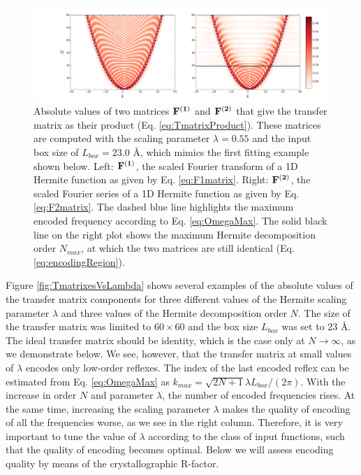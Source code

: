 \begin{figure}[H]
\label{fig:HermiteFDec}
\begin{centering}
\includegraphics[width=\textwidth]{Hermite/Fig/HermiteFTransformAndSeries.pdf}
\par\end{centering}
\caption[Matrices $\bf{F^{(1)}}$ and $\bf{F^{(2)}}$]{
Absolute values of two matrices $\bf{F^{(1)}}$ and $\bf{F^{(2)}}$ that give the transfer matrix as their product (Eq. \ref{eq:TmatrixProduct}). These matrices are computed with the scaling parameter $\lambda=0.55$ and the input box size of $L_{box}=23.0$ \AA, which mimics
the first fitting example shown below.
Left: $\bf{F^{(1)}}$, the scaled Fourier transform of a 1D Hermite function as given by Eq. \ref{eq:F1matrix}. 
Right: $\bf{F^{(2)}}$, the scaled Fourier series of a 1D Hermite function as given by Eq. \ref{eq:F2matrix}.
The dashed blue line highlights the maximum encoded frequency according to Eq. \ref{eq:OmegaMax}.
The solid black line on the right plot shows the maximum Hermite decomposition order  $N_{max}$, at which the two matrices are still identical (Eq. \ref{eq:encodingRegion}).
}
\end{figure}


Figure \ref{fig:TmatrixesVsLambda} shows several examples of the absolute values of the transfer matrix components for three different values of the Hermite scaling parameter $\lambda$ and three values of the Hermite decomposition order
$N$.
The size of the transfer matrix was limited to $60\times 60$ and the box size $L_{box}$ was set to 23 \AA. 
The ideal transfer matrix should be identity, which is the case only at $N\rightarrow\infty$, as we demonstrate below.
We see, however, that the transfer matrix at small values of $\lambda$ encodes only low-order reflexes. 
The index of the last encoded reflex can be estimated from Eq. \ref{eq:OmegaMax} as $k_{max}=\sqrt{2N+1}\lambda L_{box}/(2\pi)$.
With the increase in  order $N$ and  parameter $\lambda$, the number of encoded frequencies  rises. 
At the same time, 
increasing the scaling parameter $\lambda$ makes the quality of encoding of all the frequencies worse, as we see in the right column. 
Therefore, it is very important to tune the value of $\lambda$ according to the class of input functions, such that the quality of encoding becomes optimal.
Below we will assess encoding quality by means of the  crystallographic R-factor.

